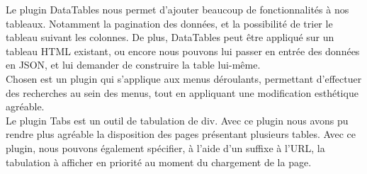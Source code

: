 Le plugin DataTables nous permet d’ajouter beaucoup de fonctionnalités à nos
tableaux. Notamment la pagination des données, et la possibilité de trier le
tableau suivant les colonnes.
De plus, DataTables peut être appliqué sur un tableau HTML existant, ou
encore nous pouvons lui passer en entrée des données en JSON, et lui demander de
construire la table lui-même.\\

Chosen est un plugin qui s’applique aux menus déroulants, permettant d’effectuer
des recherches au sein des menus, tout en appliquant une modification esthétique
agréable.\\

Le plugin Tabs est un outil de tabulation de div. Avec ce plugin nous avons pu
rendre plus agréable la disposition des pages présentant plusieurs tables. Avec
ce plugin, nous pouvons également spécifier, à l’aide d’un suffixe à l’URL, la
tabulation à afficher en priorité au moment du chargement de la page.
